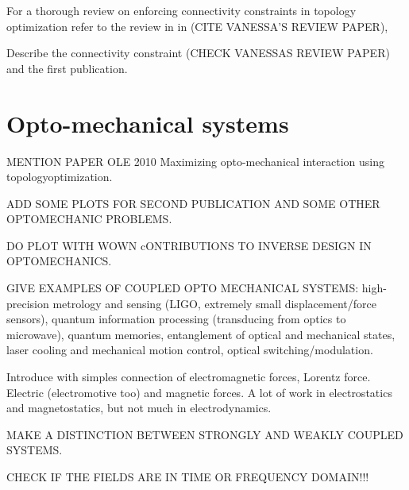 For a thorough review on enforcing connectivity constraints in topology optimization
refer to the review in in (CITE VANESSA'S REVIEW PAPER),


Describe the connectivity constraint (CHECK VANESSAS REVIEW PAPER) and the first publication.

\section{Opto-mechanical systems~\cite{ownpub1,ownpub2,ownpub3}}

MENTION PAPER OLE 2010 Maximizing opto-mechanical interaction using topologyoptimization.


ADD SOME PLOTS FOR SECOND PUBLICATION AND SOME OTHER OPTOMECHANIC PROBLEMS.

DO PLOT WITH WOWN cONTRIBUTIONS TO INVERSE DESIGN IN OPTOMECHANICS.

GIVE EXAMPLES OF COUPLED OPTO MECHANICAL SYSTEMS: high-precision metrology and sensing (LIGO, extremely small displacement/force sensors),
quantum information processing (transducing from optics to microwave), quantum memories, 
entanglement of optical and mechanical states, laser cooling and mechanical motion control,
optical switching/modulation.

Introduce with simples connection of electromagnetic forces, Lorentz force. Electric (electromotive too) and 
magnetic forces. A lot of work in electrostatics and magnetostatics, but not much in
electrodynamics.

MAKE A DISTINCTION BETWEEN STRONGLY AND WEAKLY COUPLED SYSTEMS.

CHECK IF THE FIELDS ARE IN TIME OR FREQUENCY DOMAIN!!!

